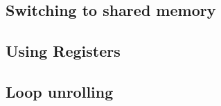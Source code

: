 \subsection{Switching to shared memory}



\subsection{Using Registers}



\subsection{Loop unrolling}\label{sec:loopUnrolling}
















